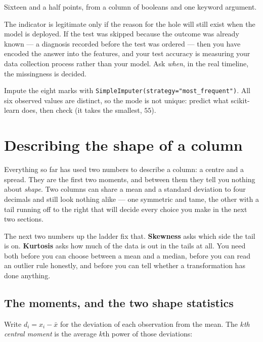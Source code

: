 \documentclass[11pt]{article}
\begin{document}
Sixteen and a half points, from a column of booleans and one keyword argument.

\begin{caution}
The indicator is legitimate only if the reason for the hole will still exist
when the model is deployed. If the test was skipped because the outcome was
already known --- a diagnosis recorded before the test was ordered --- then
you have encoded the answer into the features, and your test accuracy is
measuring your data collection process rather than your model. Ask
\emph{when}, in the real timeline, the missingness is decided.
\end{caution}

\begin{tryit}
Impute the eight marks with
\texttt{SimpleImputer(strategy="most\_frequent")}. All six observed values are
distinct, so the mode is not unique: predict what scikit-learn does, then check
(it takes the smallest, $55$).
\end{tryit}

\section{Describing the shape of a column}
\label{sec:shape}

Everything so far has used two numbers to describe a column: a centre and a
spread. They are the first two moments, and between them they tell you nothing
about \emph{shape}. Two columns can share a mean and a standard deviation to
four decimals and still look nothing alike --- one symmetric and tame, the
other with a tail running off to the right that will decide every choice you
make in the next two sections.

The next two numbers up the ladder fix that. \textbf{Skewness} asks which side
the tail is on. \textbf{Kurtosis} asks how much of the data is out in the tails
at all. You need both before you can choose between a mean and a median, before
you can read an outlier rule honestly, and before you can tell whether a
transformation has done anything.

\subsection{The moments, and the two shape statistics}

Write $d_i = x_i - \bar{x}$ for the deviation of each observation from the
mean. The \emph{$k$th central moment} is the average $k$th power of those
deviations:
\end{document}
